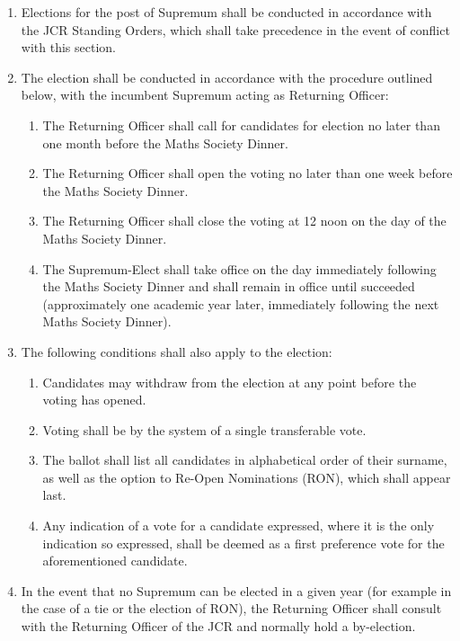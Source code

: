 \documentclass[pdftex,a4paper]{report}
\begin{document}
\begin{enumerate}[resume*]
	\item Elections for the post of Supremum shall be conducted in accordance with the JCR Standing Orders, which shall take precedence in the event of conflict with this section.
	\item The election shall be conducted in accordance with the procedure outlined below, with the incumbent Supremum acting as Returning Officer:
	\begin{enumerate}[label=\roman*)]
		\item The Returning Officer shall call for candidates for election no later than one month before the Maths Society Dinner.
		\item The Returning Officer shall open the voting no later than one week before the Maths Society Dinner.
		\item The Returning Officer shall close the voting at 12 noon on the day of the Maths Society Dinner.
		\item The Supremum-Elect shall take office on the day immediately following the Maths Society Dinner and shall remain in office until succeeded (approximately one academic year later, immediately following the next Maths Society Dinner).
	\end{enumerate}
	\item The following conditions shall also apply to the election:
	\begin{enumerate}[label=\roman*)]
		\item Candidates may withdraw from the election at any point before the voting has opened.
		\item Voting shall be by the system of a single transferable vote.
		\item The ballot shall list all candidates in alphabetical order of their surname, as well as the option to Re-Open Nominations (RON), which shall appear last.
		\item Any indication of a vote for a candidate expressed, where it is the only indication so expressed, shall be deemed as a first preference vote for the aforementioned candidate.
	\end{enumerate}
	\item In the event that no Supremum can be elected in a given year (for example in the case of a tie or the election of RON), the Returning Officer shall consult with the Returning Officer of the JCR and normally hold a by-election.
\end{enumerate}
\end{document}
